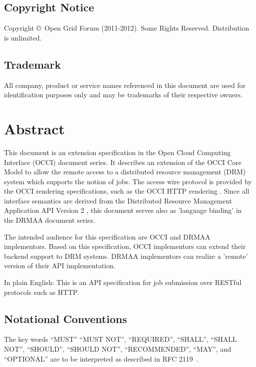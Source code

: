 \documentclass[10pt]{article}
\newcommand{\copyrightyears}{2011-2012}
\begin{document}
\subsection*{Copyright Notice}

Copyright \copyright \ Open Grid Forum (\copyrightyears).  Some Rights Reserved.  
Distribution is unlimited.

\subsection*{Trademark}

All company, product or service names referenced in this document are used for identification purposes only and may be trademarks of their respective owners. 

\section*{Abstract}

This document is an extension specification in the Open Cloud Computing Interface (OCCI) document series. It describes an extension of the OCCI Core Model \cite{gfd183} to allow the remote access to a distributed resource management (DRM) system which supports the notion of jobs. The access wire protocol is provided by the OCCI rendering specifications, such as the OCCI HTTP rendering \cite{gfd185}. Since all interface semantics are derived from the Distributed Resource Management Application API Version 2 \cite{gfd194}, this document serves also as 'language binding' in the DRMAA document series.

The intended audience for this specification are OCCI and DRMAA implementors. Based on this specification, OCCI implementors can extend their backend support to DRM systems. DRMAA implementors can realize a 'remote' version of their API implementation. 

In plain English: This is an API specification for job submission over RESTful protocols such as HTTP.

\newpage

\subsection*{Notational Conventions}
\label{sec:rfc2119}

The key words \enquote{MUST} \enquote{MUST NOT}, \enquote{REQUIRED}, \enquote{SHALL}, \enquote{SHALL NOT}, \enquote{SHOULD}, \enquote{SHOULD NOT}, \enquote{RECOMMENDED}, \enquote{MAY},  and \enquote{OPTIONAL} are to be interpreted as described in RFC 2119~\cite{rfc2119}. 
\end{document}
